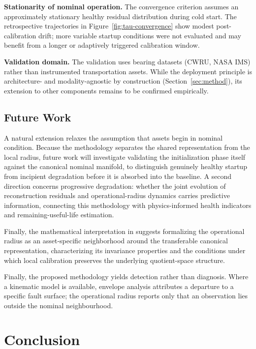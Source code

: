 \documentclass{trbunofficial}
\begin{document}
\textbf{Stationarity of nominal operation.} The convergence criterion assumes an approximately
stationary healthy residual distribution during cold start. The retrospective trajectories in
Figure~\ref{fig:tau-convergence} show modest post-calibration drift; more variable startup
conditions were not evaluated and may benefit from a longer or adaptively triggered calibration
window.

\textbf{Validation domain.} The validation uses bearing datasets (CWRU, NASA IMS) rather than
instrumented transportation assets. While the deployment principle is architecture- and
modality-agnostic by construction (Section~\ref{sec:method}), its extension to other components
remains to be confirmed empirically.



\subsection{Future Work}

A natural extension relaxes the assumption that assets begin in nominal condition. Because the
methodology separates the shared representation from the local radius, future work will
investigate validating the initialization phase itself against the canonical nominal manifold, to
distinguish genuinely healthy startup from incipient degradation before it is absorbed into the
baseline. A second direction concerns progressive degradation: whether the joint evolution of
reconstruction residuals and operational-radius dynamics carries predictive information,
connecting this methodology with physics-informed health indicators and remaining-useful-life
estimation.

Finally, the mathematical interpretation in \citep{disanti2026quotient} suggests formalizing the
operational radius as an asset-specific neighborhood around the transferable canonical
representation, characterizing its invariance properties and the conditions under which local
calibration preserves the underlying quotient-space structure.

Finally, the proposed methodology yields detection rather than diagnosis.
Where a kinematic model is available, envelope analysis attributes a
departure to a specific fault surface; the operational radius reports only
that an observation lies outside the nominal neighbourhood.


\section{Conclusion}
\label{sec:conclusion}
\end{document}
